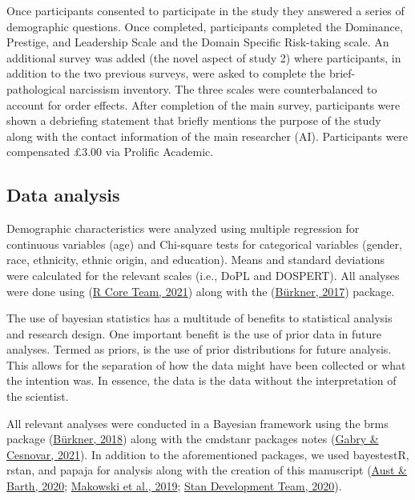\documentclass[
  donotrepeattitle,doc, 12pt, a4paper,floatsintext]{apa7}
\begin{document}
Once participants consented to participate in the study they answered a series of demographic questions. Once completed, participants completed the Dominance, Prestige, and Leadership Scale and the Domain Specific Risk-taking scale. An additional survey was added (the novel aspect of study 2) where participants, in addition to the two previous surveys, were asked to complete the brief-pathological narcissism inventory. The three scales were counterbalanced to account for order effects. After completion of the main survey, participants were shown a debriefing statement that briefly mentions the purpose of the study along with the contact information of the main researcher (AI). Participants were compensated £3.00 via Prolific Academic.

\hypertarget{data-analysis-1}{%
\subsection{Data analysis}\label{data-analysis-1}}

Demographic characteristics were analyzed using multiple regression for continuous variables (age) and Chi-square tests for categorical variables (gender, race, ethnicity, ethnic origin, and education). Means and standard deviations were calculated for the relevant scales (i.e., DoPL and DOSPERT). All analyses were done using (\protect\hyperlink{ref-rcoreteam2021}{R Core Team, 2021}) along with the (\protect\hyperlink{ref-burkner2017}{Bürkner, 2017}) package.

The use of bayesian statistics has a multitude of benefits to statistical analysis and research design. One important benefit is the use of prior data in future analyses. Termed as priors, is the use of prior distributions for future analysis. This allows for the separation of how the data might have been collected or what the intention was. In essence, the data is the data without the interpretation of the scientist.

All relevant analyses were conducted in a Bayesian framework using the brms package (\protect\hyperlink{ref-burkner2018}{Bürkner, 2018}) along with the cmdstanr packages notes (\protect\hyperlink{ref-gabry2021}{Gabry \& Cesnovar, 2021}). In addition to the aforementioned packages, we used bayestestR, rstan, and papaja for analysis along with the creation of this manuscript (\protect\hyperlink{ref-aust2020}{Aust \& Barth, 2020}; \protect\hyperlink{ref-makowski2019}{Makowski et al., 2019}; \protect\hyperlink{ref-standevelopmentteam2020}{Stan Development Team, 2020}).
\end{document}
